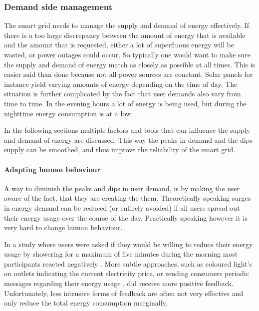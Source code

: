 \subsubsection{Demand side management}

The smart grid needs to manage the supply and demand of energy effectively. If there is a too large discrepancy between the amount of energy that is available and the amount that is requested, either a lot of superfluous energy will be wasted, or power outages could occur.
So typically one would want to make sure the supply and demand of energy match as closely as possible at all times. This is easier said than done because not all power sources are constant. Solar panels for instance yield varying amounts of energy depending on the time of day. The situation is further complicated by the fact that user demands also vary from time to time. In the evening hours a lot of energy is being used, but during the nighttime energy consumption is at a low.

In the following sections multiple factors and tools that can influence the supply and demand of energy are discussed. This way the peaks in demand and the dips supply can be smoothed, and thus improve the reliability of the smart grid.

\paragraph{Adapting human behaviour}
A way to diminish the peaks and dips in user demand, is by making the user aware of the fact, that they are creating the them. Theoretically speaking surges in energy demand can be reduced (or entirely avoided) if all users spread out their energy usage over the course of the day. Practically speaking however it is very hard to change human behaviour.

In a study where users were asked if they would be willing to reduce their energy usage by showering for a maximum of five minutes during the morning most participants reacted negatively \cite{GouldenBedwellRennick-EgglestoneEtAl2014}. More subtle approaches, such as coloured light's on outlets indicating the current electricity price, or sending consumers periodic messages regarding their energy usage \cite{AyresRasemanShih2012}, did receive more positive feedback. Unfortunately, less intrusive forms of feedback are often not very effective and only reduce the total energy consumption marginally.


